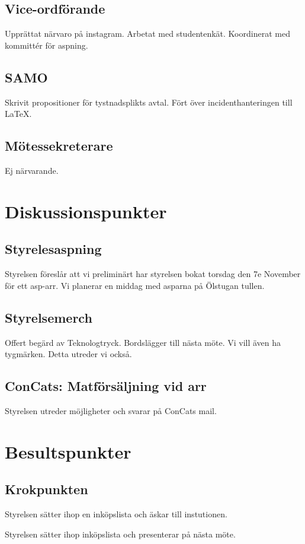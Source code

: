 \documentclass[protokoll]{dvd}
\begin{document}
\subsection{Vice-ordförande}
Upprättat närvaro på instagram. Arbetat med studentenkät. 
Koordinerat med kommittér för aspning. 

\subsection{SAMO}
Skrivit propositioner för tystnadsplikts avtal. Fört över incidenthanteringen till LaTeX.


\subsection{Mötessekreterare}

Ej närvarande.


\newpage


\section{Diskussionspunkter}
\subsection*{Styrelesaspning}
Styrelsen föreslår att vi preliminärt har styrelsen bokat torsdag den 7e November för ett asp-arr. Vi planerar en middag med asparna på Ölstugan tullen.

\subsection*{Styrelsemerch}
Offert begärd av Teknologtryck. Bordslägger till nästa möte.
Vi vill även ha tygmärken. Detta utreder vi också.

\subsection*{ConCats: Matförsäljning vid arr}
Styrelsen utreder möjligheter och svarar på ConCats mail. 

\section{Besultspunkter}

\subsection{Krokpunkten}
Styrelsen sätter ihop en inköpslista och äskar till instutionen.
\begin{attsatser}
    \item Styrelsen sätter ihop inköpslista och presenterar på nästa möte.
\end{attsatser}
\end{document}
